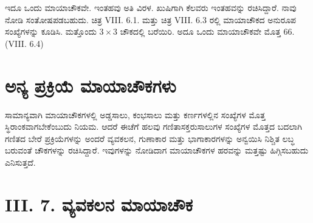ಇದೂ ಒಂದು ಮಾಯಾಚೌಕವೇ. ಇಂತಹವು ಅತಿ ವಿರಳ. ಖುಷಿಗಾಗಿ ಕೆಲವರು ಇಂತಹ\-ವನ್ನು ರಚಿಸಿದ್ದಾರೆ. ನಾವು ನೋಡಿ ಸಂತೋಷಪಡಬಹುದು. ಚಿತ್ರ VIII. 6.1. ಮತ್ತು ಚಿತ್ರ VIII. 6.3 ರಲ್ಲಿ ಮಾಯಾಚೌಕದ ಅನುರೂಪ ಸಂಖ್ಯೆಗಳನ್ನು ಕೂಡಿಸಿ. ಮತ್ತೊಂದು $3 \times 3$ ಚೌಕದಲ್ಲಿ ಬರೆಯಿರಿ. ಅದೂ ಒಂದು ಮಾಯಾಚೌಕವೇ ಮೊತ್ತ 66. (VIII. 6.4)

\section*{ಅನ್ಯ ಪ್ರಕ್ರಿಯೆ ಮಾಯಾಚೌಕಗಳು}

ಸಾಮಾನ್ಯವಾಗಿ ಮಾಯಾಚೌಕಗಳಲ್ಲಿ ಅಡ್ಡಸಾಲು, ಕಂಭಸಾಲು ಮತ್ತು ಕರ್ಣಗಳಲ್ಲಿನ ಸಂಖ್ಯೆ\-ಗಳ ಮೊತ್ತ ಸ್ಥಿರಾಂಕವಾಗಬೇಕೆಂಬುದು ನಿಯಮ. ಆದರೆ ಈಚೆಗೆ ಹಲವು ಗಣಿತಾಸಕ್ತರು\break ಸಾಲುಗಳ ಸಂಖ್ಯೆಗಳ ಮೊತ್ತದ ಬದಲಾಗಿ ಗಣಿತದ ಬೇರೆ ಪ್ರಕ್ರಿಯೆಗಳನ್ನು ಅಂದರೆ ವ್ಯವಕಲನ, ಗುಣಾಕಾರ ಮತ್ತು ಭಾಗಾಕಾರಗಳನ್ನು ಅನ್ವಯಿಸಿ ನಿಶ್ಚಿತ ಲಬ್ಧ ಬರುವಂತೆ ಚೌಕಗಳನ್ನು ರಚಿಸಿ\-ದ್ದಾರೆ. ಇವುಗಳನ್ನು ನೋಡಿದಾಗ ಮಾಯಾಚೌಕಗಳ ಹರವನ್ನು ಮತ್ತಷ್ಟು ಹಿಗ್ಗಿಸ\-ಬಹುದು ಎನಿಸು\-ತ್ತದೆ.

\section*{ III. 7. ವ್ಯವಕಲನ ಮಾಯಾಚೌಕ}

